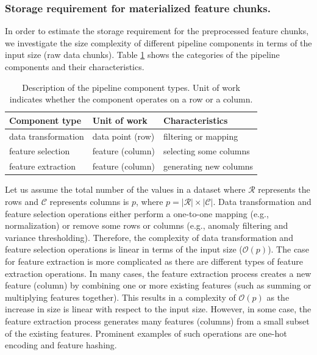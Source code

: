 \subsubsection{Storage requirement for materialized feature chunks.} 
In order to estimate the storage requirement for the preprocessed feature chunks, we investigate the size complexity of different pipeline components in terms of the input size (raw data chunks).
Table \ref{pipeline-component-description} shows the categories of the pipeline components and their characteristics.
\begin{table}[h!]
\centering
\begin{tabular}{lll}
\hline
\textbf{Component type}  & \textbf{Unit of work} &\textbf{Characteristics}  \\
\hline
data transformation			& data point (row)       	  & filtering or mapping        \\
feature selection            & feature (column)             & selecting some columns\\
feature extraction & feature (column) & generating new columns \\
\hline
\end{tabular}
\caption{Description of the pipeline component types. Unit of work indicates whether the component operates on a row or a column.}  
 \vspace{-20pt}
\label{pipeline-component-description}
\end{table}
Let us assume the total number of the values in a dataset where $\mathcal{R}$ represents the rows and $\mathcal{C}$ represents columns is $p$, where $p = |\mathcal{R}| \times |\mathcal{C}|$.
Data transformation and feature selection operations either perform a one-to-one mapping (e.g., normalization) or remove some rows or columns (e.g., anomaly filtering and variance thresholding).
Therefore, the complexity of data transformation and feature selection operations is linear in terms of the input size ($\mathcal{O}(p)$).
The case for feature extraction is more complicated as there are different types of feature extraction operations.
In many cases, the feature extraction process creates a new feature (column) by combining one or more existing features (such as summing or multiplying features together).
This results in a complexity of $\mathcal{O}(p)$ as the increase in size is linear with respect to the input size.
However, in some case, the feature extraction process generates many features (columns) from a small subset of the existing features.
Prominent examples of such operations are one-hot encoding and feature hashing.

